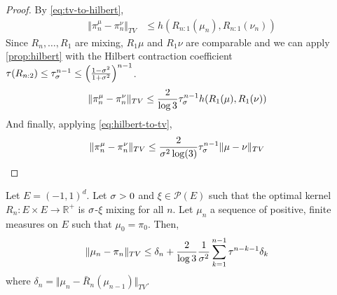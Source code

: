 \begin{proof}
   By \cref{eq:tv-to-hilbert},
\begin{align}
    \Vert \pi^\mu_n - \pi^\nu_n \Vert_{TV} & \leq h(R_{n:1}(\mu_n), R_{n:1}(\nu_n))
\end{align}
Since $R_{n}, \ldots, R_1$ are mixing, $R_{1}\mu$ and $R_1\nu$ are comparable and we can apply \cref{prop:hilbert} with the Hilbert contraction coefficient $\tau(R_{n:2})\leq \tau_\sigma^{n-1}\leq\left(\frac{1-\sigma^2}{1+\sigma^2}\right)^{n-1}$.
\begin{align}
    \Vert \pi^\mu_n - \pi^\nu_n \Vert_{TV} & \leq \frac{2}{\log 3}\tau_\sigma^{n-1}h(R_{1}(\mu), R_{1}(\nu))
\end{align}
And finally, applying \cref{eq:hilbert-to-tv},
\begin{align}
    \Vert \pi^\mu_n - \pi^\nu_n \Vert_{TV} & \leq \frac{2}{\sigma^2\log(3)}\tau_\sigma^{n-1}\Vert \mu - \nu\Vert_{TV}
\end{align}
\end{proof}
\begin{proposition}\label{prop:lemma_bound}
    Let $E = (-1, 1)^d$. Let $\sigma>0$ and $\xi\in\mathcal P(E)$ such that the optimal kernel $R_n:E\times E\to \mathbb R^+$ is $\sigma$-$\xi$ mixing for all $n$. Let $\mu_n$ a sequence of positive, finite measures on $E$ such that $\mu_0=\pi_0$. Then,
\begin{align}
    \Vert \mu_n - \pi_n \Vert_{TV} & \leq \delta_n + \frac{2}{\log 3}\frac{1}{\sigma^2}\sum_{k=1}^{n-1}\tau^{n-k-1}\delta_k
\end{align}
where $\delta_n = \Vert \mu_n - \bar R_n(\mu_{n-1})\Vert_{TV}$.
\end{proposition}

